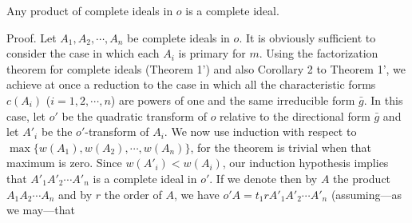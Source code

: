 Any product of complete ideals in $o$ is a complete ideal.

Proof. Let $A_1, A_2, \cdots, A_n$ be complete ideals in $o$. It is obviously sufficient to consider the case in which each $A_i$ is primary for $m$. Using the factorization theorem for complete ideals (Theorem 1') and also Corollary 2 to Theorem 1', we achieve at once a reduction to the case in which all the characteristic forms $c(A_i)$ ($i=1, 2, \cdots, n$) are powers of one and the same irreducible form $\bar{g}$. In this case, let $o'$ be the quadratic transform of $o$ relative to the directional form $\bar{g}$ and let $A'_i$ be the $o'$-transform of $A_i$. We now use induction with respect to $\max \{w(A_1), w(A_2), \cdots, w(A_n)\}$, for the theorem is trivial when that maximum is zero. Since $w(A'_i) < w(A_i)$, our induction hypothesis implies that $A'_1 A'_2 \cdots A'_n$ is a complete ideal in $o'$. If we denote then by $A$ the product $A_1 A_2 \cdots A_n$ and by $r$ the order of $A$, we have $o' A = t_1 r A'_1 A'_2 \cdots A'_n$ (assuming—as we may—that